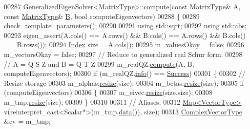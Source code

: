 \begin{DoxyCode}
{\hyperlink{group___eigenvalues___module_a275910b47dfe5f40211dcb59cfd68f3c}{00287} \hyperlink{group___eigenvalues___module_a275910b47dfe5f40211dcb59cfd68f3c}{GeneralizedEigenSolver<MatrixType>::compute}(\textcolor{keyword}{const} 
      \hyperlink{group___eigenvalues___module_a56f4b9823bb9a267de3aaf48428cd247}{MatrixType}& \hyperlink{group___core___module_class_eigen_1_1_matrix}{A}, \textcolor{keyword}{const} \hyperlink{group___eigenvalues___module_a56f4b9823bb9a267de3aaf48428cd247}{MatrixType}& \hyperlink{group___core___module_class_eigen_1_1_matrix}{B}, \textcolor{keywordtype}{bool} computeEigenvectors)
00288 \{
00289   check\_template\_parameters();
00290   
00291   \textcolor{keyword}{using} std::sqrt;
00292   \textcolor{keyword}{using} std::abs;
00293   eigen\_assert(A.cols() == A.rows() && B.cols() == A.rows() && B.cols() == B.rows());
00294   \hyperlink{group___eigenvalues___module_a46a0ff3841059479ec314e56a5645302}{Index} size = A.cols();
00295   m\_valuesOkay = \textcolor{keyword}{false};
00296   m\_vectorsOkay = \textcolor{keyword}{false};
00297   \textcolor{comment}{// Reduce to generalized real Schur form:}
00298   \textcolor{comment}{// A = Q S Z and B = Q T Z}
00299   m\_realQZ.\hyperlink{group___eigenvalues___module_a2b6847964d9f1903193cc3e67c196849}{compute}(A, B, computeEigenvectors);
00300   \textcolor{keywordflow}{if} (m\_realQZ.\hyperlink{group___eigenvalues___module_a36bd77afed89f3f5c110a715e69e4c64}{info}() == \hyperlink{group__enums_gga85fad7b87587764e5cf6b513a9e0ee5ea52581b035f4b59c203b8ff999ef5fcea}{Success})
00301   \{
00302     \textcolor{comment}{// Resize storage}
00303     m\_alphas.\hyperlink{class_eigen_1_1_plain_object_base_a99d9054ee2d5a40c6e00ded0265e9cea}{resize}(size);
00304     m\_betas.\hyperlink{class_eigen_1_1_plain_object_base_a99d9054ee2d5a40c6e00ded0265e9cea}{resize}(size);
00305     \textcolor{keywordflow}{if} (computeEigenvectors)
00306     \{
00307       m\_eivec.\hyperlink{class_eigen_1_1_plain_object_base_a99d9054ee2d5a40c6e00ded0265e9cea}{resize}(size,size);
00308       m\_tmp.\hyperlink{class_eigen_1_1_plain_object_base_a99d9054ee2d5a40c6e00ded0265e9cea}{resize}(size);
00309     \}
00310 
00311     \textcolor{comment}{// Aliases:}
00312     \hyperlink{group___core___module_class_eigen_1_1_map}{Map<VectorType>} v(reinterpret\_cast<Scalar*>(m\_tmp.\hyperlink{class_eigen_1_1_plain_object_base_ac25699535374b1854cf8494e44ad31b2}{data}()), size);
00313     \hyperlink{group___core___module}{ComplexVectorType} &cv = m\_tmp;
}
\end{DoxyCode}
